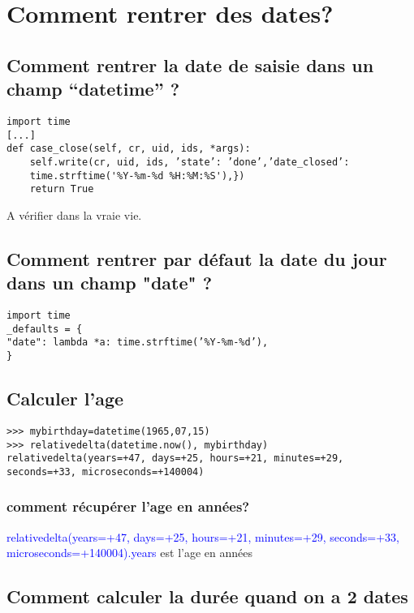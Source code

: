 \documentclass[12pt,a4paper]{article}
\begin{document}
\section{Comment rentrer des dates?}
\label{renterdate}

\subsection{ Comment rentrer la date de saisie dans un champ “datetime” ?}
\label{sec:defaultnow}



\begin{verbatim}
import time
[...]
def case_close(self, cr, uid, ids, *args):
    self.write(cr, uid, ids, ’state’: ’done’,’date_closed’:
    time.strftime('%Y-%m-%d %H:%M:%S'),})
    return True
\end{verbatim}
A vérifier dans la vraie vie.

\subsection{ Comment rentrer par défaut la date du jour dans un champ "date" ?}
\label{sec:defaultnowdate}

\begin{verbatim}
import time
_defaults = {
"date": lambda *a: time.strftime(’%Y-%m-%d’),
}
\end{verbatim}

\subsection{Calculer l'age }
\label{sec:age}


\begin{verbatim}
>>> mybirthday=datetime(1965,07,15)
>>> relativedelta(datetime.now(), mybirthday)
relativedelta(years=+47, days=+25, hours=+21, minutes=+29, seconds=+33, microseconds=+140004)
\end{verbatim}

\subsubsection{comment récupérer l'age en années?}
\label{sec:years}

\textcolor{blue}{relativedelta(years=+47, days=+25, hours=+21, minutes=+29, seconds=+33, microseconds=+140004).years} est l'age en années

\subsection{Comment calculer la durée quand on a 2 dates}
\label{sec:duree}
\end{document}
